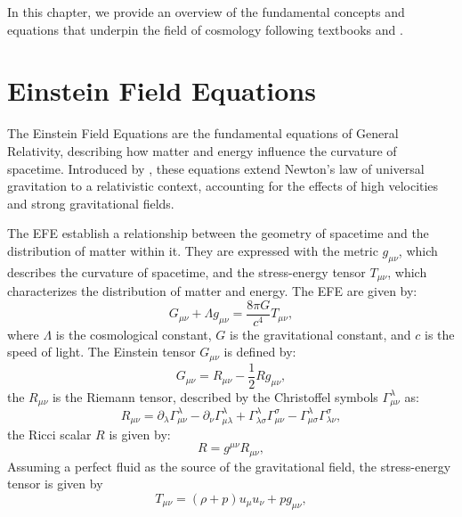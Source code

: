 In this chapter, we provide an overview of the fundamental concepts and equations that underpin the field of cosmology following textbooks \citet{2003moco.book.....D} and \citet{2008cosm.book.....W}.

\section{Einstein Field Equations}
The Einstein Field Equations are the fundamental equations of General Relativity, describing how matter and energy influence the curvature of spacetime. Introduced by \citet{1915SPAW.......844E}, these equations extend Newton's law of universal gravitation to a relativistic context, accounting for the effects of high velocities and strong gravitational fields.

The EFE establish a relationship between the geometry of spacetime and the distribution of matter within it. They are expressed with the metric $g_{\mu\nu}$, which describes the curvature of spacetime, and the stress-energy tensor $T_{\mu\nu}$, which characterizes the distribution of matter and energy. The EFE are given by:
\begin{equation}
    G_{\mu\nu} + \Lambda g_{\mu\nu}= \frac{8\pi G}{c^4} T_{\mu\nu},
    \label{eq:einstein_field_equations}
\end{equation}
where $\Lambda$ is the cosmological constant, $G$ is the gravitational constant, and $c$ is the speed of light. The Einstein tensor $G_{\mu\nu}$ is defined by:
\begin{equation}
    G_{\mu\nu} = R_{\mu\nu} - \frac{1}{2} R g_{\mu\nu},
    \label{eq:einstein_tensor}
\end{equation}
the $R_{\mu\nu}$ is the Riemann tensor, described by the Christoffel symbols $\Gamma^\lambda_{\mu\nu}$ as:
\begin{equation}
    R_{\mu\nu} = \partial_\lambda \Gamma^\lambda_{\mu\nu} - \partial_\nu \Gamma^\lambda_{\mu\lambda} + \Gamma^\lambda_{\lambda\sigma} \Gamma^\sigma_{\mu\nu} - \Gamma^\lambda_{\mu\sigma} \Gamma^\sigma_{\lambda\nu},
    \label{eq:ricci_curvature_tensor}
\end{equation}
the Ricci scalar $R$ is given by:
\begin{equation}
    R = g^{\mu\nu} R_{\mu\nu},
    \label{eq:ricci_scalar}
\end{equation}
Assuming a perfect fluid as the source of the gravitational field, the stress-energy tensor is given by
\begin{equation}
    T_{\mu\nu} = \left(\rho + p \right) u_{\mu} u_{\nu} + p g_{\mu\nu},
    \label{eq:stress_energy_tensor}
\end{equation}
